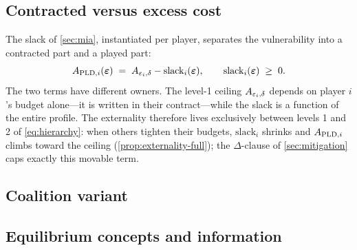 \subsection{Contracted versus excess cost}
\label{sec:decomposition}

The slack of \cref{sec:mia}, instantiated per player, separates the
vulnerability into a contracted part and a played part:
\begin{equation}
A_{\mathrm{PLD},i}(\boldsymbol{\varepsilon}) \;=\; A_{\varepsilon_i,\delta}
- \mathrm{slack}_i(\boldsymbol{\varepsilon}),
\qquad
\mathrm{slack}_i(\boldsymbol{\varepsilon}) \;\geq\; 0.
\label{eq:decomp}
\end{equation}
The two terms have different owners. The level-1 ceiling
$A_{\varepsilon_i,\delta}$ depends on player $i$'s budget alone---it is
written in their contract---while the slack is a function of the
entire profile. The externality therefore lives exclusively between
levels 1 and 2 of \eqref{eq:hierarchy}: when others tighten their
budgets, $\mathrm{slack}_i$ shrinks and $A_{\mathrm{PLD},i}$ climbs toward the
ceiling (\cref{prop:externality-full}); the $\Delta$-clause of
\cref{sec:mitigation} caps exactly this movable term.

\subsection{Coalition variant}


\subsection{Equilibrium concepts and information}

